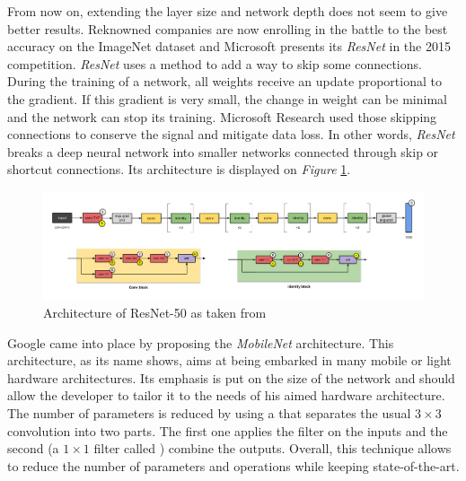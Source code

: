 From now on, extending the layer size and network depth does not seem to give better results. Reknowned companies are now enrolling in the battle to the best accuracy on the ImageNet dataset \cite{ImageNet2009} and Microsoft presents its \emph{ResNet} \cite{He2015} in the 2015 competition. \emph{ResNet} uses a method to add a way to skip some connections. During the training of a network, all weights receive an update proportional to the gradient. If this gradient is very small, the change in weight can be minimal and the network can stop its training. Microsoft Research used those skipping connections to conserve the signal and mitigate data loss. In other words, \emph{ResNet} breaks a deep neural network into smaller networks connected through skip or shortcut connections. Its architecture is displayed on \emph{Figure} \ref{fig:ResNet-50}.

\begin{figure}[htbp]
	\centering
		\includegraphics[width=15cm]{Figures/ResNet-50.png}
	\caption[ResNet-50]{Architecture of ResNet-50 as taken from \cite{He2015}}
	\label{fig:ResNet-50}
\end{figure}

Google came into place by proposing the \emph{MobileNet} \cite{Howard2017} architecture. This architecture, as its name shows, aims at being embarked in many mobile or light hardware architectures. Its emphasis is put on the size of the network and should allow the developer to tailor it to the needs of his aimed hardware architecture. The number of parameters is reduced by using a  that separates the usual $3 \times 3$ convolution into two parts. The first one applies the filter on the inputs and the second (a $1 \times 1$ filter called ) combine the outputs. Overall, this technique allows to reduce the number of parameters and operations while keeping state-of-the-art.


